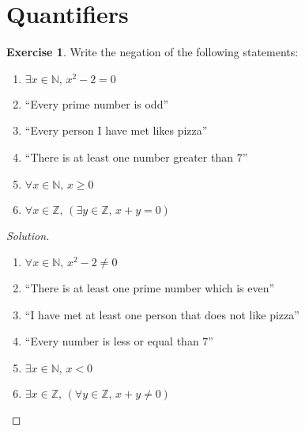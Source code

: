 \documentclass[a4paper,oneside]{article}
\theoremstyle{definition} \newtheorem{exercise}{Exercise}[section]
\begin{document}
\section{Quantifiers}

\begin{exercise}
  Write the negation of the following statements:
  \begin{enumerate}
    \item $\exists x\in \mathbb N,\, x^2-2=0$
    \item ``Every prime number is odd''
    \item ``Every person I have met likes pizza''
    \item ``There is at least one number greater than $7$''
    \item $\forall x\in \mathbb N,\,x\geq 0$
    \item $\forall x\in \mathbb Z,\,(\exists y\in\mathbb Z,\,x+y=0)$
  \end{enumerate}
\end{exercise}
\begin{proof}[Solution]
  \begin{enumerate}
    \item $\forall x\in\mathbb N,\, x^2-2\neq 0$
    \item ``There is at least one prime number which is even''
    \item ``I have met at least one person that does not like pizza''
    \item ``Every number is less or equal than $7$''
    \item $\exists x\in\mathbb N,\, x<0$
    \item $\exists x\in \mathbb Z,\, (\forall y\in \mathbb Z,\, x+y\neq 0)$
  \end{enumerate}
\end{proof}
\end{document}

